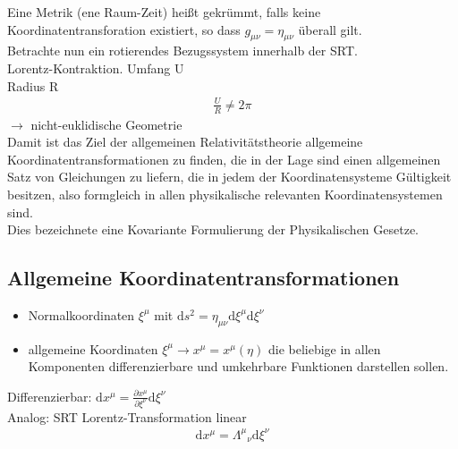 \documentclass[a4paper]{article}
\begin{document}
Eine Metrik (ene Raum-Zeit) heißt gekrümmt, falls keine
Koordinatentransforation existiert, so dass
$g_{\mu\nu}=\eta_{\mu\nu}$ überall gilt.\\
Betrachte nun ein rotierendes Bezugssystem innerhalb der SRT.\\
Lorentz-Kontraktion.
Umfang U\\
Radius R\\
\begin{align}
\frac{U}{R}\neq2\pi
\end{align}
$\rightarrow$ nicht-euklidische Geometrie\\
Damit ist das Ziel der allgemeinen Relativitätstheorie allgemeine
Koordinatentransformationen zu finden, die in der Lage sind einen allgemeinen
Satz von Gleichungen zu liefern, die in jedem der Koordinatensysteme Gültigkeit
besitzen, also formgleich in allen physikalische relevanten Koordinatensystemen
sind.\\
Dies bezeichnete eine Kovariante Formulierung der Physikalischen Gesetze.
\subsection{Allgemeine Koordinatentransformationen}
\begin{itemize}
  \item Normalkoordinaten $\xi^\mu$ mit $\mathrm{d}s^2=\eta_{\mu\nu}\mathrm{d}
\xi^\mu\mathrm{d}\xi^\nu$ 
\item allgemeine Koordinaten $\xi^\mu\rightarrow x^\mu=x^\mu(\eta)$ die
beliebige in allen Komponenten differenzierbare und umkehrbare Funktionen
darstellen sollen.   
\end{itemize}
Differenzierbar: $\mathrm{d}x^\mu=\frac{\partial x^\mu}{\partial
\xi^\nu}\mathrm{d}\xi^\nu$\\
Analog: SRT Lorentz-Transformation linear
\begin{align}
\mathrm{d}x^\mu=\Lambda^\mu{}_\nu \mathrm{d}\xi^\nu
\end{align}
\end{document}
